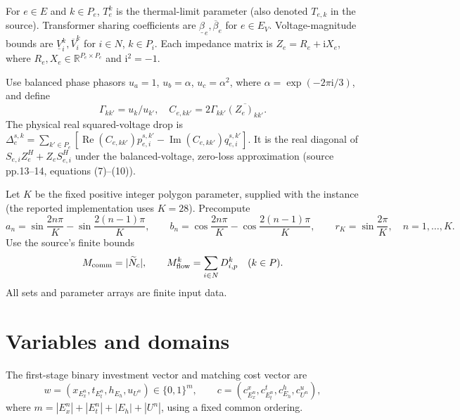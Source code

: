 \documentclass[11pt]{article}
\begin{document}
For $e\in E$ and $k\in P_e$, $T_e^k$ is the thermal-limit parameter (also denoted $T_{e,k}$ in the source). Transformer sharing coefficients are $\underline\beta_e,\overline\beta_e$ for $e\in E_V$. Voltage-magnitude bounds are $\underline V_i^k,\overline V_i^k$ for $i\in N$, $k\in P_i$. Each impedance matrix is $Z_e=R_e+\mathrm i X_e$, where $R_e,X_e\in\mathbb R^{P_e\times P_e}$ and $\mathrm i^2=-1$.

Use balanced phase phasors $u_a=1$, $u_b=\alpha$,
$u_c=\alpha^2$, where $\alpha=\exp(-2\pi\mathrm i/3)$, and define
\[
 \Gamma_{kk'}=u_k/u_{k'},\quad
 C_{e,kk'}=2\Gamma_{kk'}\overline{(Z_e)_{kk'}}.
\]
The physical real squared-voltage drop is
$\Delta_e^{s,k}=\sum_{k'\in P_e}
[\operatorname{Re}(C_{e,kk'})p_{e,i}^{s,k'}
-\operatorname{Im}(C_{e,kk'})q_{e,i}^{s,k'}]$.
It is the real diagonal of $S_{e,i}Z_e^H+Z_eS_{e,i}^H$ under the
balanced-voltage, zero-loss approximation (source pp.13--14, equations (7)--(10)).

Let $K$ be the fixed positive integer polygon parameter, supplied with the instance (the reported implementation uses $K=28$). Precompute
\[
a_n=\sin\frac{2n\pi}{K}-\sin\frac{2(n-1)\pi}{K},\qquad
b_n=\cos\frac{2n\pi}{K}-\cos\frac{2(n-1)\pi}{K},\qquad
r_K=\sin\frac{2\pi}{K},\quad n=1,\ldots,K.
\]
Use the source's finite bounds
\[
M_{\rm comm}=|\widetilde N_c|,\qquad
M_{\rm flow}^k=\sum_{i\in N}D_{i,p}^k\quad(k\in P).
\]
All sets and parameter arrays are finite input data.

\section{Variables and domains}
The first-stage binary investment vector and matching cost vector are
\[
w=(x_{E_x^n},t_{E_t^n},h_{E_h},u_{U^n})\in\{0,1\}^m,
\qquad c=(c^x_{E_x^n},c^t_{E_t^n},c^h_{E_h},c^u_{U^n}),
\]
where $m=|E_x^n|+|E_t^n|+|E_h|+|U^n|$, using a fixed common ordering.
\end{document}
